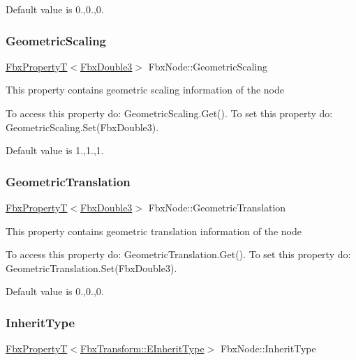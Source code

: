 Default value is 0.,0.,0. \mbox{\label{class_fbx_node_abc071af68acc0b2fa5fd98ce8d40471f}} 
\subsubsection{\texorpdfstring{Geometric\+Scaling}{GeometricScaling}}
{\footnotesize\ttfamily \hyperlink{class_fbx_property_t}{Fbx\+PropertyT}$<$\hyperlink{fbxtypes_8h_ae0a96f14cde566774c7553aa7523b7a7}{Fbx\+Double3}$>$ Fbx\+Node\+::\+Geometric\+Scaling}

This property contains geometric scaling information of the node

To access this property do\+: Geometric\+Scaling.\+Get(). To set this property do\+: Geometric\+Scaling.\+Set(\+Fbx\+Double3).

Default value is 1.,1.,1. \mbox{\label{class_fbx_node_a34e3c56f86ea2484d512bfbaf2958bb6}} 
\subsubsection{\texorpdfstring{Geometric\+Translation}{GeometricTranslation}}
{\footnotesize\ttfamily \hyperlink{class_fbx_property_t}{Fbx\+PropertyT}$<$\hyperlink{fbxtypes_8h_ae0a96f14cde566774c7553aa7523b7a7}{Fbx\+Double3}$>$ Fbx\+Node\+::\+Geometric\+Translation}

This property contains geometric translation information of the node

To access this property do\+: Geometric\+Translation.\+Get(). To set this property do\+: Geometric\+Translation.\+Set(\+Fbx\+Double3).

Default value is 0.,0.,0. \mbox{\label{class_fbx_node_a649fc6e97217d0105e65b712d2b0053f}} 
\subsubsection{\texorpdfstring{Inherit\+Type}{InheritType}}
{\footnotesize\ttfamily \hyperlink{class_fbx_property_t}{Fbx\+PropertyT}$<$\hyperlink{class_fbx_transform_ac1ab8f75b4873723daa68c57f999b10f}{Fbx\+Transform\+::\+E\+Inherit\+Type}$>$ Fbx\+Node\+::\+Inherit\+Type}


